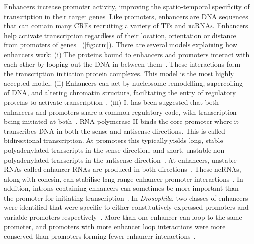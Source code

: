 \documentclass[../main.tex]{subfiles}
\begin{document}
Enhancers increase promoter activity, improving the spatio\hyp{}temporal
specificity of transcription in their target genes. Like promoters,
enhancers are DNA sequences that can contain many CREs recruiting a
variety of TFs and ncRNAs. Enhancers help activate transcription
regardless of their location, orientation or distance from promoters of
genes~\autocite{banerjiExpressionBetaglobinGene1981} (\autoref{fig:crm}). There
are several models explaining how enhancers work: (i) The proteins bound
to enhancers and promoters interact with each other by looping out the
DNA in between them~\autocite{carterLongrangeChromatinRegulatory2002,tolhuisLoopingInteractionHypersensitive2002,vilarDNALoopingGene2005,delaatChapterThreeDimensional2008,amanoChromosomalDynamicsShh2009}.
These interactions form the
transcription initiation protein complexes. This model is the most
highly accepted model. (ii) Enhancers can act by nucleosome remodelling,
supercoiling of DNA, and altering chromatin structure, facilitating the
entry of regulatory proteins to activate transcription~\autocite{corlessEffectsDNASupercoiling2016}. (iii) It has been suggested that both enhancers and
promoters share a common regulatory code, with transcription being
initiated at both~\autocite{coreNascentRNASequencing2008,engreitzLocalRegulationGene2016}. RNA polymerase II binds the core
promoter where it transcribes DNA in both the sense and antisense
directions. This is called bidirectional transcription. At promoters
this typically yields long, stable polyadenylated transcripts in the
sense direction, and short, unstable non\hyp{}polyadenylated transcripts in
the antisense direction~\autocite{anderssonPromoterEnhancerWhat2015}. At enhancers, unstable RNAs
called enhancer RNAs are produced in both directions~\autocite{dingEnhancerRNAsERNAs2018}.
These ncRNAs, along with cohesin, can stabilise long range
enhancer\hyp{}promoter interactions~\autocite{oromLongNoncodingRNAs2010}. In addition, introns
containing enhancers can sometimes be more important than the promoter
for initiating transcription~\autocite{gallegosIntronDNASequences2017}. In \textit{Drosophila}, two
classes of enhancers were identified that were specific to either
constitutively expressed promoters and variable promoters respectively~\autocite{zabidiEnhancerCorepromoterSpecificity2015}.
More than one enhancer can loop to the same promoter, and promoters with more enhancer loop interactions were more conserved than promoters forming fewer enhancer interactions~\autocite{dankoDynamicEvolutionRegulatory2018a}.
\end{document}
